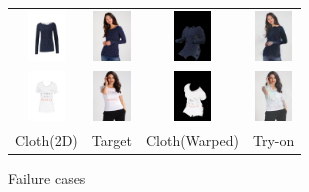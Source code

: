 \begin{figure}
   \centering
\begin{tabular}{cccc}

\includegraphics[width=1cm]{figures/c2dw/000118_1.png}&
\includegraphics[width=1cm]{figures/image/000118_0.jpg}&
\includegraphics[width=1cm]{figures/c3dwfull/000118_1_000118_0.png}&
\includegraphics[width=1cm]{figures/try-on/000118_1_000118_0.jpg}\\

\includegraphics[width=1cm]{figures/c2dw/004508_1.png}&
\includegraphics[width=1cm]{figures/image/004508_0.jpg}&
\includegraphics[width=1cm]{figures/c3dwfull/004508_1_004508_0.png}&
\includegraphics[width=1cm]{figures/try-on/004508_1_004508_0.jpg}\\

Cloth(2D)&Target&Cloth(Warped)&Try-on\\

\end{tabular}

    \caption{Failure cases}
    \label{fig:failurecases}
    
\end{figure}



